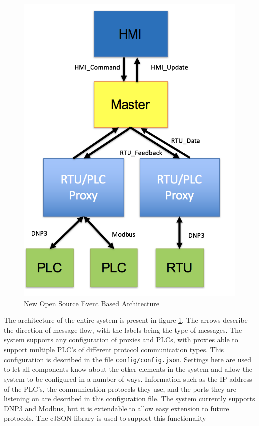 \documentclass[11pt,a4paper,oldfontcommands]{memoir}
\def\code#1{\texttt{#1}}
\begin{document}
\begin{figure}[ht]
  \begin{center}
  \includegraphics{new_architecture}
  \caption{New Open Source Event Based Architecture}
  \label{fig:2}
  \end{center}
\end{figure}

\indent \indent
The architecture of the entire system is present in figure \ref{fig:2}. The arrows describe
the direction of message flow, with the labels being the type of messages. The system
supports any configuration of proxies and PLCs, with proxies able to support multiple
PLC's of different protocol communication types. 
This configuration is described in the file
\code{config/config.json}. Settings here are used to let all components know about 
the other
elements in the system and allow the system to be configured in a number of ways. 
Information such as the IP address of the PLC's, the communication protocols they use,
and the ports they are listening on are described in this configuration file. 
The system currently supports DNP3 and Modbus, but it is extendable to allow
easy extension to future protocols. The cJSON library is used to support this
functionality \cite{cJSON}\\
\end{document}
